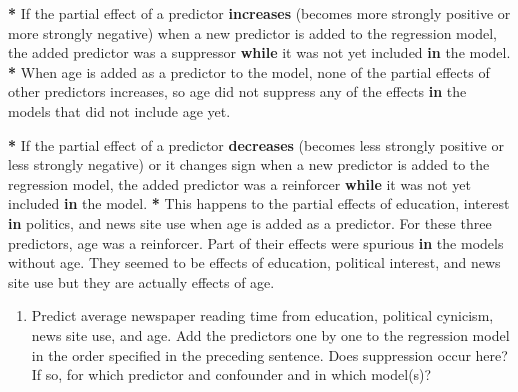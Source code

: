 \documentclass[a4paper]{book}
\newenvironment{Shaded}{\begin{snugshade}}{\end{snugshade}}
\newcommand{\KeywordTok}[1]{\textcolor[rgb]{0,0,0}{\textbf{#1}}}
\newcommand{\StringTok}[1]{\textcolor[rgb]{0.00,0.00,0.00}{#1}}
\newcommand{\ControlFlowTok}[1]{\textcolor[rgb]{0.00,0.00,0.00}{\textbf{#1}}}
\newcommand{\OperatorTok}[1]{\textcolor[rgb]{0.00,0.00,0.00}{\textbf{#1}}}
\newcommand{\NormalTok}[1]{#1}
\providecommand{\tightlist}{%
  \setlength{\itemsep}{0pt}\setlength{\parskip}{0pt}}
\theoremstyle{definition}
\theoremstyle{definition}
\theoremstyle{definition}
\theoremstyle{remark}
\begin{document}
\begin{Shaded}
\begin{Highlighting}[]
\OperatorTok{*}\StringTok{ }\NormalTok{If the partial effect of a predictor }\KeywordTok{increases}\NormalTok{ (becomes more strongly}
\NormalTok{positive or more strongly negative) when a new predictor is added to the}
\NormalTok{regression model, the added predictor was a suppressor }\ControlFlowTok{while}\NormalTok{ it was not yet}
\NormalTok{included }\ControlFlowTok{in}\NormalTok{ the model.}
\OperatorTok{*}\StringTok{ }\NormalTok{When age is added as a predictor to the model, none of the partial effects}
\NormalTok{of other predictors increases, so age did not suppress any of the effects }\ControlFlowTok{in}
\NormalTok{the models that did not include age yet.}
  
\OperatorTok{*}\StringTok{ }\NormalTok{If the partial effect of a predictor }\KeywordTok{decreases}\NormalTok{ (becomes less strongly}
\NormalTok{positive or less strongly negative) or it changes sign when a new predictor is}
\NormalTok{added to the regression model, the added predictor was a reinforcer }\ControlFlowTok{while}\NormalTok{ it}
\NormalTok{was not yet included }\ControlFlowTok{in}\NormalTok{ the model.}
\OperatorTok{*}\StringTok{ }\NormalTok{This happens to the partial effects of education, interest }\ControlFlowTok{in}\NormalTok{ politics, and}
\NormalTok{news site use when age is added as a predictor. For these three predictors,}
\NormalTok{age was a reinforcer. Part of their effects were spurious }\ControlFlowTok{in}\NormalTok{ the models}
\NormalTok{without age. They seemed to be effects of education, political interest, and}
\NormalTok{news site use but they are actually effects of age.}
\end{Highlighting}
\end{Shaded}

\begin{enumerate}
\def\labelenumi{\arabic{enumi}.}
\setcounter{enumi}{2}
\tightlist
\item
  Predict average newspaper reading time from education, political
  cynicism, news site use, and age. Add the predictors one by one to the
  regression model in the order specified in the preceding sentence.
  Does suppression occur here? If so, for which predictor and confounder
  and in which model(s)?
\end{enumerate}
\end{document}
